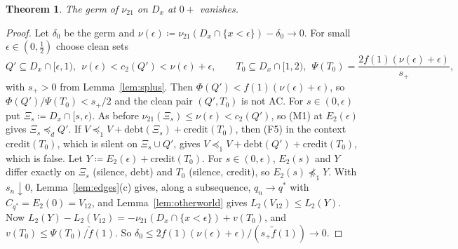 \documentclass[11pt]{article}
\newtheorem{theorem}{Theorem}
\theoremstyle{definition}\newtheorem{definition}[theorem]{Definition}
\theoremstyle{remark}\newtheorem{remark}[theorem]{Remark}
\newcommand{\debt}{\mathrm{debt}}
\newcommand{\cred}{\mathrm{credit}}
\newcommand{\Band}{\Xi}
\newcommand{\ftil}{\tilde f}
\begin{document}
\begin{theorem}\label{thm:zerogerm}
The germ of $\nu_{21}$ on $D_x$ at $0+$ vanishes.
\end{theorem}
\begin{proof}
Let $\delta_0$ be the germ and $\nu(\epsilon)\coloneqq\nu_{21}(D_x\cap
\{x<\epsilon\})-\delta_0\to0$. For small $\epsilon\in(0,\frac12)$ choose clean
sets
\[
 Q'\subseteq D_x\cap[\epsilon,1),\ \ \nu(\epsilon)<c_2(Q')<\nu(\epsilon)+
 \epsilon,\qquad
 T_0\subseteq D_x\cap[1,2),\ \ \Psi(T_0)=\frac{2f(1)(\nu(\epsilon)+\epsilon)}
 {s_+},
\]
with $s_+>0$ from Lemma~\ref{lem:splus}. Then $\Phi(Q')<f(1)(\nu(\epsilon)+
\epsilon)$, so $\Phi(Q')/\Psi(T_0)<s_+/2$ and the clean pair $(Q',T_0)$ is
not AC. For $s\in(0,\epsilon)$ put $\Band_s\coloneqq D_x\cap[s,\epsilon)$.
As before $\nu_{21}(\Band_s)\le\nu(\epsilon)<c_2(Q')$, so (M1) at
$E_2(\epsilon)$ gives $\Band_s\preceq_dQ'$. If
$V\preceq_1V+\debt(\Band_s)+\cred(T_0)$, then (F5) in the context
$\cred(T_0)$, which is silent on $\Band_s\cup Q'$, gives
$V\preceq_1V+\debt(Q')+\cred(T_0)$, which is false. Let
$Y\coloneqq E_2(\epsilon)+\cred(T_0)$. For $s\in(0,\epsilon)$, $E_2(s)$ and
$Y$ differ exactly on $\Band_s$ (silence, debt) and $T_0$ (silence, credit),
so $E_2(s)\not\preceq_1Y$. With $s_n\downarrow0$, Lemma~\ref{lem:edges}(c)
gives, along a subsequence, $q_n\to q^*$ with $C_{q^*}=E_2(0)=V_{12}$, and
Lemma~\ref{lem:otherworld} gives $L_2(V_{12})\le L_2(Y)$. Now
$L_2(Y)-L_2(V_{12})=-\nu_{21}(D_x\cap\{x<\epsilon\})+v(T_0)$, and
$v(T_0)\le\Psi(T_0)/\ftil(1)$. So $\delta_0\le2f(1)(\nu(\epsilon)+\epsilon)/
(s_+\ftil(1))\to0$.
\end{proof}
\end{document}
